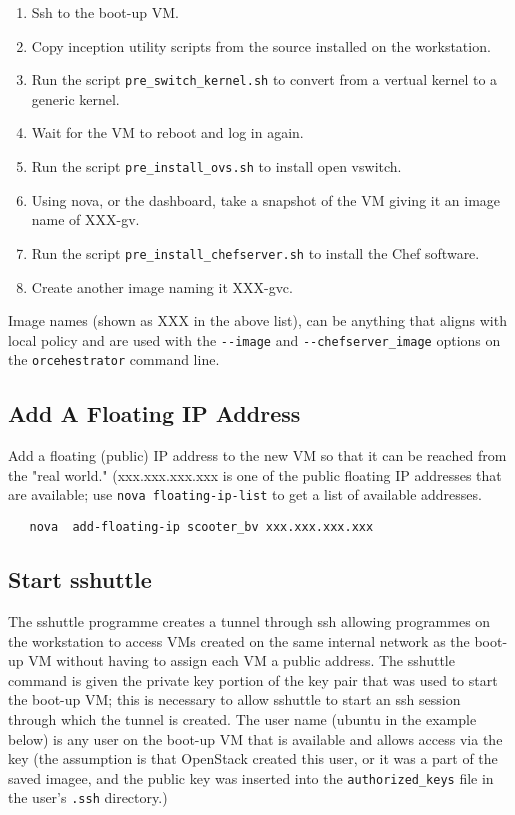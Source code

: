 \begin{enumerate}
	\item Ssh to the boot-up VM.
	\item Copy inception utility scripts from the source installed on the workstation.
	\item Run the script \verb!pre_switch_kernel.sh! to convert from a vertual kernel to a generic kernel.
	\item Wait for the VM to reboot and log in again.
	\item Run the script \verb!pre_install_ovs.sh! to install open vswitch.
	\item Using nova, or the dashboard, take a snapshot of the VM giving it an image name of XXX-gv.
	\item Run the script \verb!pre_install_chefserver.sh! to install the Chef software.
	\item Create another image naming it XXX-gvc.
\end{enumerate}

Image names (shown as XXX in the above list), can be anything that aligns with local policy and are used 
with the \verb!--image! and \verb!--chefserver_image! options on the \verb!orcehestrator! command line.

\subsection{Add A Floating IP Address}
Add a floating (public) IP address to the new VM so that it can be reached from the "real world."
(xxx.xxx.xxx.xxx is one of the public floating IP addresses that are available; use \verb!nova floating-ip-list!
to get a list of available addresses.

\small\begin{verbatim}
   nova  add-floating-ip scooter_bv xxx.xxx.xxx.xxx
\end{verbatim}\normalsize

\subsection{Start sshuttle}
The sshuttle programme creates a tunnel through ssh allowing programmes on the workstation to access VMs created on the
same internal network as the boot-up VM without having to assign each VM a public address.
The sshuttle command is given the private key portion of the key pair that was used to start the boot-up VM; this is
necessary to allow sshuttle to start an ssh session through which the tunnel is created.
The user name (ubuntu in the example below) is any user on the boot-up VM that is available and allows access via
the key (the assumption is that OpenStack created this user, or it was a part of the saved imagee,  and the public key was
inserted into the \verb!authorized_keys! file in the user's \verb!.ssh! directory.)

